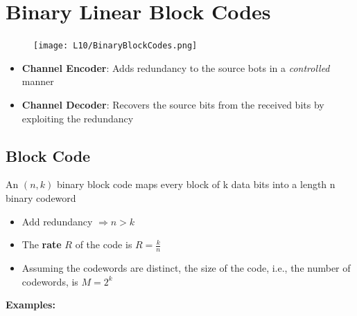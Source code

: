 \documentclass[12pt]{article}
\begin{document}
\section{Binary Linear Block Codes}
\begin{figure}[H]
    \centering
    \texttt{[image: L10/BinaryBlockCodes.png]}
\end{figure}
\begin{itemize}
    \item \textbf{Channel Encoder}: Adds redundancy to the source bots in a \textit{controlled} manner
    \item \textbf{Channel Decoder}: Recovers the source bits from the received bits by exploiting the redundancy
\end{itemize}
\subsection{Block Code}
An $(n,k)$ binary block code maps every block of k data bits into a length n binary codeword
\begin{itemize}
    \item Add redundancy $\Rightarrow n>k$
    \item The \textbf{rate} $R$ of the code is $R=\frac{k}{n}$
    \item Assuming the codewords are distinct, the size of the code, i.e., the number of codewords, is $M=2^k$
\end{itemize}
\textbf{Examples:}
\end{document}
